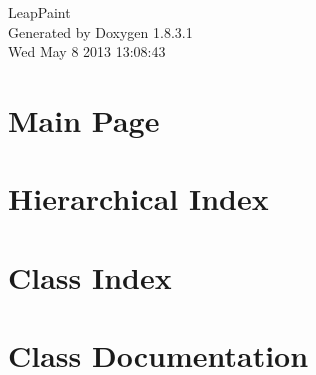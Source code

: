 \documentclass{article}
\begin{document}
\hypersetup{pageanchor=false,citecolor=blue}
\begin{titlepage}
\vspace*{7cm}
\begin{center}
{\Large Leap\-Paint }\\
\vspace*{1cm}
{\large Generated by Doxygen 1.8.3.1}\\
\vspace*{0.5cm}
{\small Wed May 8 2013 13:08:43}\\
\end{center}
\end{titlepage}
\tableofcontents
{}
\hypersetup{pageanchor=true,citecolor=blue}
\section{Main Page}
\label{index}\hypertarget{index}{}
\section{Hierarchical Index}

\section{Class Index}

\section{Class Documentation}





























\printindex
\end{document}
